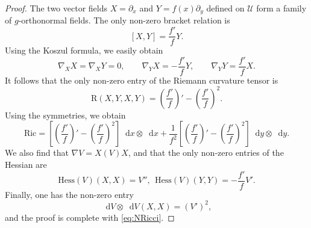 \documentclass[10pt,a4paper]{amsart}
\newcommand*\diff{\mathop{}\!\mathrm{d}}
\newcommand{\hes}{\mathrm{Hess}}
\begin{document}
\begin{proof}
The two vector fields $X = \partial_x$ and $Y = f(x) \partial_y$ defined on $\mathcal{U}$ form a family of $g$-orthonormal fields. The only non-zero bracket relation is
\[
[X, Y] = \frac{f'}{f} Y.
\]
Using the Koszul formula, we easily obtain
\[
\nabla_X X = \nabla_X Y = 0, \qquad \nabla_Y X = - \frac{f'}{f} Y, \qquad \nabla_Y Y = \frac{f'}{f} X.
\]
It follows that the only non-zero entry of the Riemann curvature tensor is
\[
\mathrm{R}(X, Y, X, Y) = \left(\frac{f'}{f}\right)' - \left(\frac{f'}{f}\right)^2.
\]
Using the symmetries, we obtain
\[
\mathrm{Ric} = \left[\left(\frac{f'}{f}\right)' - \left(\frac{f'}{f}\right)^2\right] \diff x \otimes \diff x + \frac{1}{f^2}\left[\left(\frac{f'}{f}\right)' - \left(\frac{f'}{f}\right)^2\right] \diff y \otimes \diff y.
\]
We also find that $\nabla V =X(V)X$, and that the only non-zero entries of the Hessian are
\[\hes(V)(X,X) = V'',~~\hes(V)(Y,Y)=-\frac{f'}{f}V'.\]
Finally, one has the non-zero entry
\[\diff V\otimes \diff V(X,X)=(V')^2,\]
and the proof is complete with \cref{eq:NRicci}.
\end{proof}
\end{document}
